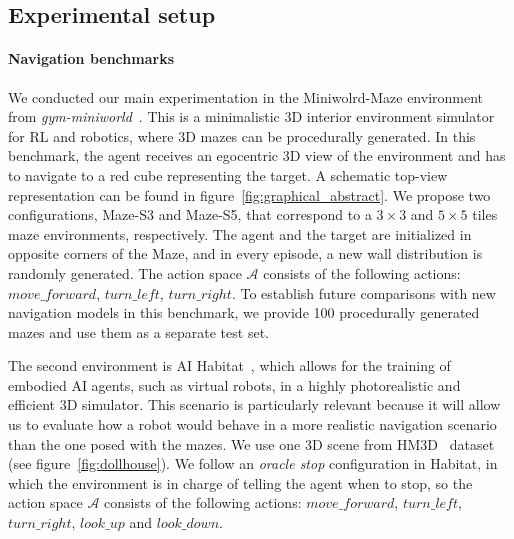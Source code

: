 \subsection{Experimental setup}\label{subsec:experimental-setup}



\paragraph{Navigation benchmarks}
We conducted our main experimentation in the Miniwolrd-Maze environment from \textit{gym-miniworld}~\cite{gym_miniworld}.
This is a minimalistic 3D interior environment simulator for RL and robotics, where 3D mazes can be procedurally generated.
In this benchmark, the agent receives an egocentric 3D view of the environment and has to navigate to a red cube representing the target.
A schematic top-view representation can be found in figure~\ref{fig:graphical_abstract}.
We propose two configurations, Maze-S3 and Maze-S5, that correspond to a $3\times3$ and $5\times5$ tiles maze environments, respectively.
The agent and the target are initialized in opposite corners of the Maze, and in every episode, a new wall distribution is randomly generated.
The action space $\mathcal{A}$ consists of the following actions: $move\_forward$, $turn\_left$, $turn\_right$.
To establish future comparisons with new navigation models in this benchmark, we provide 100 procedurally generated mazes and use them as a separate test set.


The second environment is AI Habitat~\cite{szot2021}, which allows for the training of embodied AI agents, such as virtual robots, in a highly photorealistic and efficient 3D simulator.
This scenario is particularly relevant because it will allow us to evaluate how a robot would behave in a more realistic navigation scenario than the one posed with the mazes.
We use one 3D scene from HM3D~\cite{ramakrishnan2021} dataset (see figure~\ref{fig:dollhouse}).
We follow an \textit{oracle stop} configuration in Habitat, in which the environment is in charge of telling the agent when to stop, so the action space $\mathcal{A}$ consists of the following actions: $move\_forward$, $turn\_left$, $turn\_right$, $look\_up$ and $look\_down$.


